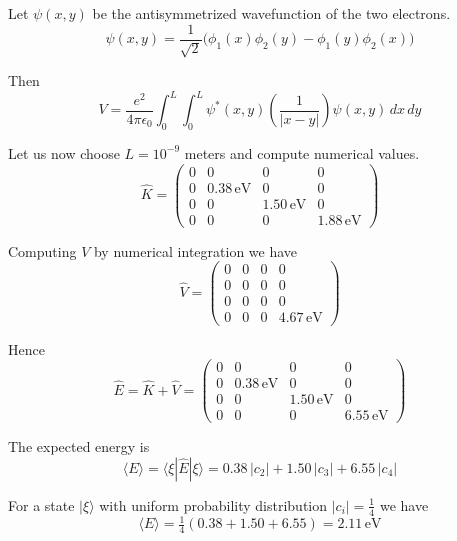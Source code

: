 \documentclass[12pt]{article}
\begin{document}
Let $\psi(x,y)$ be the antisymmetrized wavefunction of the two electrons.
\begin{equation*}
\psi(x,y)=\frac{1}{\sqrt{2}}\big(\phi_1(x)\phi_2(y)-\phi_1(y)\phi_2(x)\big)
\end{equation*}

Then
\begin{equation*}
V=\frac{e^2}{4\pi\epsilon_0}\int_0^L\int_0^L
\psi^*(x,y)\left(\frac{1}{|x-y|}\right)\psi(x,y)\,dx\,dy
\end{equation*}

Let us now choose $L=10^{-9}$ meters and compute numerical values.
\begin{equation*}
\hat{K}=\begin{pmatrix}
0 & 0 & 0 & 0\\
0 & 0.38\,\text{eV} & 0 & 0\\
0 & 0 & 1.50\,\text{eV} & 0\\
0 & 0 & 0 & 1.88\,\text{eV}
\end{pmatrix}
\end{equation*}

Computing $V$ by numerical integration we have
\begin{equation*}
\hat{V}=\begin{pmatrix}
0 & 0 & 0 & 0\\
0 & 0 & 0 & 0\\
0 & 0 & 0 & 0\\
0 & 0 & 0 & 4.67\,\text{eV}
\end{pmatrix}
\end{equation*}

Hence
\begin{equation*}
\hat{E}=\hat{K}+\hat{V}=\begin{pmatrix}
0 & 0 & 0 & 0\\
0 & 0.38\,\text{eV} & 0 & 0\\
0 & 0 & 1.50\,\text{eV} & 0\\
0 & 0 & 0 & 6.55\,\text{eV}
\end{pmatrix}
\end{equation*}

The expected energy is
\begin{equation*}
\langle E\rangle=\langle\xi|\hat E|\xi\rangle=0.38\,|c_2|+1.50\,|c_3|+6.55\,|c_4|
\end{equation*}

For a state $|\xi\rangle$ with uniform probability distribution $|c_i|=\tfrac{1}{4}$ we have
\begin{equation*}
\langle E\rangle=\tfrac{1}{4}(0.38+1.50+6.55)=2.11\,\text{eV}
\end{equation*}
\end{document}
